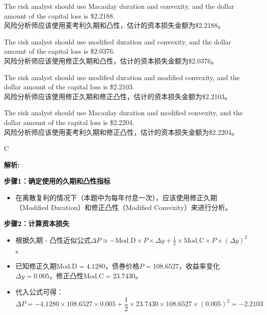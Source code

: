\documentclass{article}
\newenvironment{explanation}
{\textbf{解析:}\par}
{\par}
\begin{document}
    \begin{choices}
        \item The risk analyst should use Macaulay duration and convexity, and the dollar amount of the capital loss is \$2.2188.\\
        风险分析师应该使用麦考利久期和凸性，估计的资本损失金额为\$2.2188。
        \item The risk analyst should use modified duration and convexity, and the dollar amount of the capital loss is \$2.0376.\\
        风险分析师应该使用修正久期和凸性，估计的资本损失金额为\$2.0376。
        \item The risk analyst should use modified duration and modified convexity, and the dollar amount of the capital loss is \$2.2103.\\
        风险分析师应该使用修正久期和修正凸性，估计的资本损失金额为\$2.2103。
        \item The risk analyst should use Macaulay duration and modified convexity, and the dollar amount of the capital loss is \$2.2204.\\
        风险分析师应该使用麦考利久期和修正凸性，估计的资本损失金额为\$2.2204。
    \end{choices}
    
    \begin{correctanswer}
        C
    \end{correctanswer}
    
    \begin{explanation}
    \textbf{步骤1：确定使用的久期和凸性指标}
    \begin{itemize}
        \item 在离散复利的情况下（本题中为每年付息一次），应该使用修正久期（Modified Duration）和修正凸性（Modified Convexity）来进行分析。
    \end{itemize}
    \textbf{步骤2：计算资本损失}
    \begin{itemize}
        \item 根据久期 - 凸性近似公式\(\Delta P\approx - \text{Mod.D}\times P\times\Delta y+\frac{1}{2}\times\text{Mod.C}\times P\times(\Delta y)^{2}\)。
        \item 已知修正久期\(\text{Mod.D}=4.1280\)，债券价格\(P = 108.6527\)，收益率变化\(\Delta y=0.005\)，修正凸性\(\text{Mod.C}=23.7430\)。
        \item 代入公式可得：
         \[
         \Delta P= - 4.1280\times108.6527\times0.005+\frac{1}{2}\times23.7430\times108.6527\times(0.005)^{2}=-2.2103
         \]
        
    \end{itemize}
    \end{explanation}
    
\end{document}
